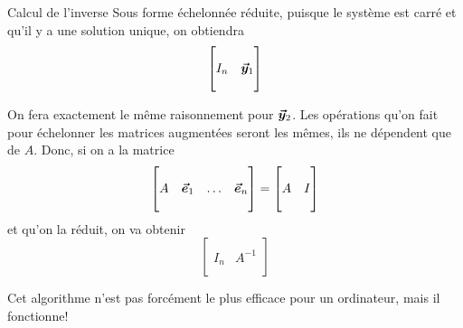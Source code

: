 \documentclass[a4paper]{article}
\begin{document}
\begin{parag}{Calcul de l'inverse}
    Sous forme échelonnée réduite, puisque le système est carré et qu'il y a une solution unique, on obtiendra
    \[\begin{bmatrix}  &  \\ I_n & \bm{\protect\vec{y}}_1 \\  &  \end{bmatrix} \]

    On fera exactement le même raisonnement pour $\bm{\protect\vec{y}}_2$. Les opérations qu'on fait pour échelonner les matrices augmentées seront les mêmes, ils ne dépendent que de $A$. Donc, si on a la matrice
    \[ \begin{bmatrix}  &  &  &  \\ A & \bm{\protect\vec{e}}_1 & \ldots & \bm{\protect\vec{e}}_n \\  &  &  &  \end{bmatrix} = \begin{bmatrix}  &  \\ A & I \\  &  \end{bmatrix} \]
    et qu'on la réduit, on va obtenir
    \[\begin{bmatrix}  &  \\ I_n & A^{-1} \\  &  \end{bmatrix} \]

    Cet algorithme n'est pas forcément le plus efficace pour un ordinateur, mais il fonctionne!
\end{parag}
\end{document}

